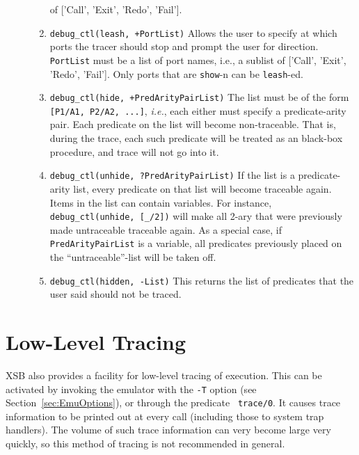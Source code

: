 \begin{description}
\begin{enumerate}
      of ['Call', 'Exit', 'Redo', 'Fail']. 
    \item {\tt debug\_ctl(leash, +PortList)}  
      Allows the user to specify at which ports the tracer should stop
      and prompt the user for direction.  {\tt PortList} must be a list of
      port names, i.e., a sublist of ['Call', 'Exit', 'Redo', 'Fail'].  Only
      ports that are {\tt show}-n can be {\tt leash}-ed. 
    \item {\tt debug\_ctl(hide, +PredArityPairList)}  
      The list must be of the form {\tt [P1/A1, P2/A2, ...]}, {\it i.e.},
      each either must specify a predicate-arity pair. Each predicate on
      the list will become non-traceable. That is, during the trace, each
      such predicate will be treated as an black-box procedure, and trace
      will not go into it.
    \item {\tt debug\_ctl(unhide, ?PredArityPairList)} If the list is a
      predicate-arity list, every predicate on that list will become
      traceable again. Items in the list can contain variables. For
      instance, {\tt debug\_ctl(unhide, [\_/2])} will make all 2-ary that
      were previously made untraceable traceable again.  As a special case,
      if {\tt PredArityPairList} is a variable, all predicates previously
      placed on the ``untraceable''-list will be taken off.
    \item {\tt debug\_ctl(hidden, -List)}
      This returns the list of predicates that the user said should not be
      traced.
   \end{enumerate}
\end{description}


\section{Low-Level Tracing}
 

XSB also provides a facility for low-level tracing of execution.  This
can be activated by invoking the emulator with the {\tt -T} option
(see Section~\ref{sec:EmuOptions}), or through the predicate {\tt
  trace/0}.   It causes trace information to
be printed out at every call (including those to system trap
handlers).  The volume of such trace information can very become large
very quickly, so this method of tracing is not recommended in general.

\bigskip

